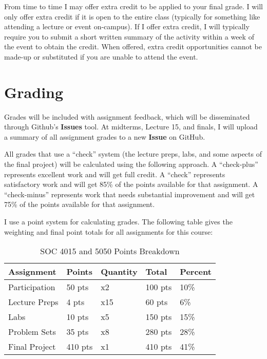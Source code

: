 \documentclass[]{book}
\theoremstyle{definition}
\theoremstyle{definition}
\theoremstyle{definition}
\theoremstyle{remark}
\begin{document}
From time to time I may offer extra credit to be applied to your final
grade. I will only offer extra credit if it is open to the entire class
(typically for something like attending a lecture or event on-campus).
If I offer extra credit, I will typically require you to submit a short
written summary of the activity within a week of the event to obtain the
credit. When offered, extra credit opportunities cannot be made-up or
substituted if you are unable to attend the event.

\hypertarget{grading}{%
\section{Grading}\label{grading}}

Grades will be included with assignment feedback, which will be
disseminated through Github's \textbf{Issues} tool. At midterms, Lecture
15, and finals, I will upload a summary of all assignment grades to a
new \textbf{Issue} on GitHub.

All grades that use a ``check'' system (the lecture preps, labs, and
some aspects of the final project) will be calculated using the
following approach. A ``check-plus'' represents excellent work and will
get full credit. A ``check'' represents satisfactory work and will get
85\% of the points available for that assignment. A ``check-minus''
represents work that needs substantial improvement and will get 75\% of
the points available for that assignment.

I use a point system for calculating grades. The following table gives
the weighting and final point totals for all assignments for this
course:

\begin{table}

\caption{\label{tab:unnamed-chunk-8}SOC 4015 and 5050 Points Breakdown}
\centering
\begin{tabular}[t]{lllll}
\toprule
Assignment & Points & Quantity & Total & Percent\\
\midrule
Participation & 50 pts & x2 & 100 pts & 10\%\\
Lecture Preps & 4 pts & x15 & 60 pts & 6\%\\
Labs & 10 pts & x5 & 150 pts & 15\%\\
Problem Sets & 35 pts & x8 & 280 pts & 28\%\\
Final Project & 410 pts & x1 & 410 pts & 41\%\\
\bottomrule
\end{tabular}
\end{table}
\end{document}
